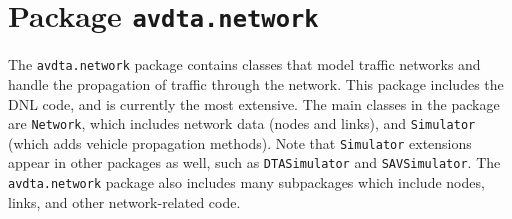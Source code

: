 \chapter{Package \texttt{avdta.network}}
\label{api:network}

The \texttt{avdta.network} package contains classes that model traffic networks and handle the propagation of traffic through the network. This package includes the DNL code, and is currently the most extensive. The main classes in the package are \texttt{Network}, which includes network data (nodes and links), and \texttt{Simulator} (which adds vehicle propagation methods). Note that \texttt{Simulator} extensions appear in other packages as well, such as \texttt{DTASimulator} and \texttt{SAVSimulator}. The \texttt{avdta.network} package also includes many subpackages which include nodes, links, and other network-related code.

